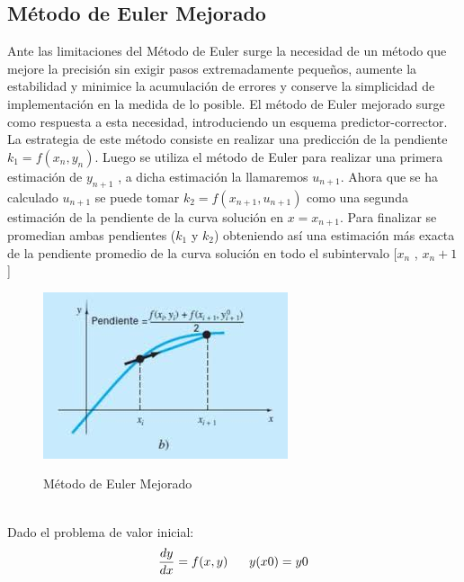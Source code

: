 \documentclass[12pt,a4paper]{article}
\begin{document}
    \subsection{Método de Euler Mejorado}
    \vspace*{1cm}
    Ante las limitaciones del Método de Euler surge la necesidad de un método que
    mejore la precisión sin exigir pasos extremadamente pequeños, aumente la estabilidad y minimice la acumulación de errores
    y conserve la simplicidad de implementación en la medida de lo posible. El método de Euler mejorado surge como respuesta a esta necesidad, introduciendo un esquema predictor-corrector.
    La estrategia de este método consiste en realizar una predicción de la pendiente
    $ k_1 = f(x_n,y_n)$. Luego se utiliza el método de Euler para realizar una primera
    estimación de $y_{n+1}$ , a dicha estimación la llamaremos $u_{n+1}$. Ahora que
    se ha calculado $u_{n+1}$ se puede tomar $k_2 = f(x_{n+1},u_{n+1})$ como
    una segunda estimación de la pendiente de la curva solución en $ x = x_{n+1}$.
    Para finalizar se promedian ambas pendientes ($k_1$ y $k_2$) obteniendo así
    una estimación más exacta de la pendiente promedio de la curva solución en 
    todo el subintervalo [$x_n$ , $x_n+1$]\\
    \vspace{1cm}
    \begin{figure}[h]
        \centering
         \includegraphics{images.jpeg}
         \label{Euler Mejorado}
         \caption{Método de Euler Mejorado}
    \end{figure}\\
    \vspace{1cm}
    Dado el problema de valor inicial:
    \begin{equation*}
        \begin{aligned}
            \frac{dy}{dx} = f(x,y)
            \hspace*{0.6cm}y(x0) = y0 
        \end{aligned}
    \end{equation*}
\end{document}
